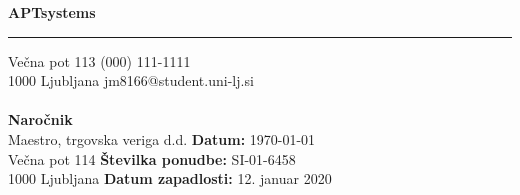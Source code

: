 \documentclass{invoice} %
\def \tab {\hspace*{3ex}} %
\begin{document}

\hfil{\Huge\bf APTsystems}\hfil %
\bigskip\break %
\hrule %

Večna pot 113 \hfill (000) 111-1111 \\ %
1000 Ljubljana \hfill jm8166@student.uni-lj.si
\\ \\
{\bf Naročnik} \\
\tab Maestro, trgovska veriga d.d. \hfill  {\bf Datum:} \today \\
\tab Večna pot 114 \hfill {\bf Številka ponudbe:} SI-01-6458\\
\tab 1000 Ljubljana \hfill {\bf Datum zapadlosti:} 12. januar 2020\\
\\
\end{document}
